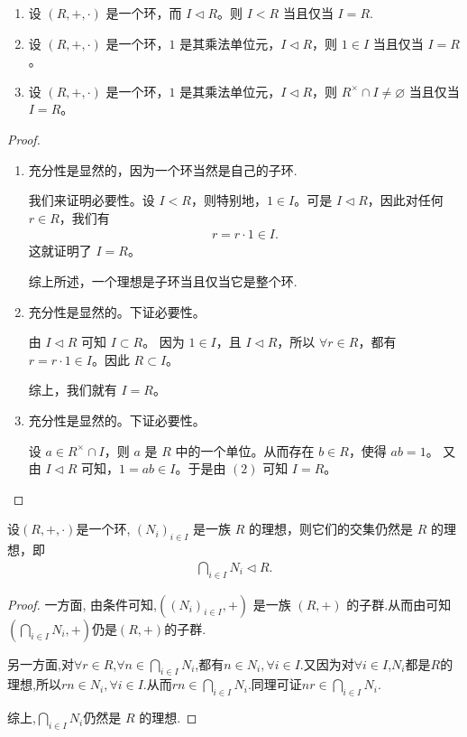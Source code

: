 \documentclass[../../main.tex]{subfiles}
\begin{document}
\begin{lemma}[理想是整个环的充要条件]\label{lemma:理想是整个环的充要条件}
\begin{enumerate}[(1)]
\item 设 $(R, +, \cdot)$ 是一个环，而 $I \lhd R$。则 $I < R$ 当且仅当 $I = R$.

\item 设 $(R, +, \cdot)$ 是一个环，$1$ 是其乘法单位元，$I \lhd R$，则 $1 \in I$ 当且仅当 $I = R$。

\item 设 $(R, +, \cdot)$ 是一个环，$1$ 是其乘法单位元，$I \lhd R$，则 $R^{\times} \cap I \neq \varnothing$ 当且仅当 $I = R$。
\end{enumerate}
\end{lemma}
\begin{proof}
\begin{enumerate}[(1)]
\item 充分性是显然的，因为一个环当然是自己的子环.

我们来证明必要性。设 $I < R$，则特别地，$1 \in I$。可是 $I \lhd R$，因此对任何 $r \in R$，我们有
\begin{align*}
r = r \cdot 1 \in I.
\end{align*}
这就证明了 $I = R$。

综上所述，一个理想是子环当且仅当它是整个环.

\item 充分性是显然的。下证必要性。

由 $I \lhd R$ 可知 $I \subset R$。
因为 $1 \in I$，且 $I \lhd R$，所以 $\forall r \in R$，都有 $r = r \cdot 1 \in I$。因此 $R \subset I$。

综上，我们就有 $I = R$。

\item 充分性是显然的。下证必要性。

设 $a \in R^{\times} \cap I$，则 $a$ 是 $R$ 中的一个单位。从而存在 $b \in R$，使得 $ab = 1$。
又由 $I \lhd R$ 可知，$1 = ab \in I$。于是由 $(2)$ 可知 $I = R$。 
\end{enumerate}
\end{proof}

\begin{proposition}[理想的任意交还是理想]\label{proposition:理想的任意交还是理想}
设$(R,+,\cdot)$是一个环, $(N_i)_{i\in I}$ 是一族 $R$ 的理想，则它们的交集仍然是 $R$ 的理想，即
\begin{align*}
\bigcap_{i\in I}N_i\lhd R .
\end{align*}
\end{proposition}
\begin{proof}
一方面,
由条件可知,$((N_i)_{i\in I},+)$ 是一族 $(R,+)$ 的子群.从而由可知$(\bigcap_{i\in I}N_i,+)$仍是$(R,+)$的子群.

另一方面,对$\forall r\in R$,$\forall n\in \bigcap_{i\in I}N_i$,都有$n\in N_i,\forall i\in I.$又因为对$\forall i\in I$,$N_i$都是$R$的理想,所以$rn\in N_i,\forall i\in I.$从而$rn\in \bigcap_{i\in I}N_i.$同理可证$nr\in \bigcap_{i\in I}N_i.$

综上,$\bigcap_{i\in I}N_i$仍然是 $R$ 的理想.
\end{proof}
\end{document}
